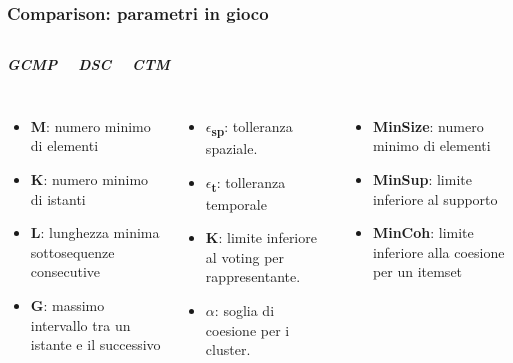 \documentclass{beamer}
\begin{document}
\begin{frame}
	\frametitle{Comparison: parametri in gioco}
	\begin{columns}
		
		\begin{center}
			\textbf{\textit{\huge{GCMP}}}
			
		\end{center}
		
		\begin{center}
			\textbf{\textit{\huge{DSC}}}
			
		\end{center}
		
		\begin{center}
			\textbf{\textit{\huge{CTM}}}
			
		\end{center}
	\end{columns}
	\begin{columns}
		
		\column{.3\columnwidth}

\begin{itemize}
	\item \textbf{M}: numero minimo di elementi
	\item \textbf{K}: numero minimo di istanti
	\item \textbf{L}: lunghezza minima sottosequenze consecutive
	\item \textbf{G}: massimo intervallo tra un istante e il successivo
\end{itemize}
		
		
		\column{.3\textwidth}
		
			\begin{itemize}
			\item \textbf{$\epsilon$\textsubscript{sp}}: tolleranza spaziale.
			\item \textbf{$\epsilon$\textsubscript{t}}: tolleranza temporale
			\item \textbf{K}: limite inferiore al voting per rappresentante.
			\item \textbf{$\alpha$}: soglia di coesione per i cluster. 
		\end{itemize}
		
		\column{.3\textwidth}
		
	\begin{itemize}
		\item \textbf{MinSize}: numero minimo di elementi
		\item \textbf{MinSup}: limite inferiore al supporto
		\item \textbf{MinCoh}: limite inferiore alla coesione per un itemset
	\end{itemize}
		
	\end{columns}
\end{frame}    
\end{document}
